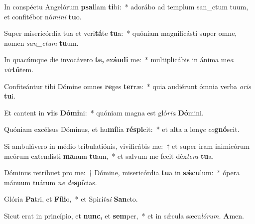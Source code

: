 \item In conspéctu Angelórum \textbf{psal}lam \textbf{ti}bi:~* adorábo ad templum san\_ctum tuum, et confitébor nó\textit{mini} \textbf{tu}o.
\item Super misericórdia tua et veri\textbf{tá}te \textbf{tu}a:~* quóniam magnificásti super omne, nomen \textit{san\_ctum} \textbf{tu}um.
\item In quacúmque die invocávero \textbf{te,} ex\textbf{áu}\textbf{di} me:~* multiplicábis in ánima me\tinyhspace\textit{a} \textit{vir}\textbf{tú}tem.
\item Confiteántur tibi Dómine omnes \textbf{re}ges \textbf{ter}ræ:~* quia audiérunt ómnia verba \textit{oris} \textbf{tu}i.
\item Et cantent in \textbf{vi}is \textbf{Dó}\textbf{mi}ni:~* quóniam magna est gló\textit{ria} \textbf{Dó}mini.
\item Quóniam excélsus Dóminus, et hu\textbf{mí}lia \textbf{ré}\textbf{spi}cit:~* et alta a lon\textit{ge} \textit{co}\textbf{gnó}scit.
\item Si ambulávero in médio tribulatiónis, vivificábis me:~† et super iram inimicórum meórum extendísti \textbf{ma}num \textbf{tu}am,~* et salvum me fecit déx\teenyhspace\textit{tera} \textbf{tu}a.
\item Dóminus retríbuet pro me:~† Dómine, misericórdia \textbf{tu}a in \textbf{sǽ}\textbf{cu}lum:~* ópera mánuum tuárum \textit{ne} \textit{de}\textbf{spí}cias.
\item Glória \textbf{Pa}tri, et \textbf{Fí}\textbf{li}o,~* et Spirí\tinyhspace\textit{tui} \textbf{San}cto.
\item Sicut erat in princípio, et \textbf{nunc,} et \textbf{sem}per,~* et in sǽcula sæcu\tinyhspace\textit{lórum.} \textbf{A}men.